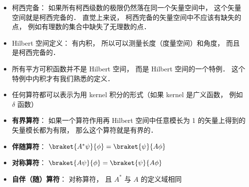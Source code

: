 
\begin{itemize}
\item 柯西完备： 如果所有柯西级数的极限仍然落在同一个矢量空间中， 这个矢量空间就是柯西完备的． 直觉上来说， 柯西完备的矢量空间中不应该有缺失的点， 例如有理数的集合中缺失了无理数的点．
\item Hilbert 空间定义： 有内积， 所以可以测量长度（度量空间）和角度， 而且是柯西完备的．
\item 所有平方可积函数并不是 Hilbert 空间， 而是 Hilbert 空间的一个特例． 这个特例中内积才有我们熟悉的定义．
\item 任何算符都可以表示为用 kernel 积分的形式（如果 kernel 是广义函数， 例如 $\delta$ 函数）
\item \textbf{有界算符}： 如果一个算符作用再 Hilbert 空间中任意模长为 1 的矢量上得到的矢量模长都为有限， 那么这个算符就是有界的．
\item \textbf{伴随算符}： $\braket{A^* \psi}{\phi} = \braket{\psi}{A \phi}$
\item \textbf{对称算符}： $\braket{A \psi}{\phi} = \braket{\psi}{A \phi}$
\item \textbf{自伴（随）算符}： 对称算符， 且 $A^*$ 与 $A$ 的定义域相同
\end{itemize}
